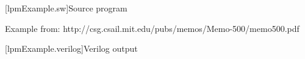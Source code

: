 
[lpmExample.sw]{Source program}

Example from: http://csg.csail.mit.edu/pubs/memos/Memo-500/memo500.pdf



[lpmExample.verilog]{Verilog output}



